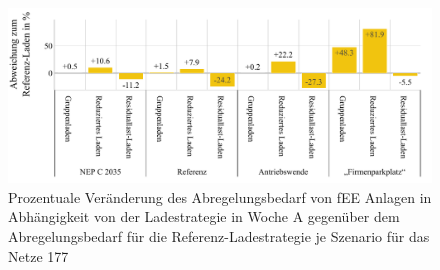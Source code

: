 \begin{figure}[H]
    \centering
    \includegraphics[width=\textwidth]{Bilder/177_cur_fee_grid_week_A}
    \caption{Prozentuale Veränderung des Abregelungsbedarf von fEE Anlagen in Abhängigkeit von der Ladestrategie in Woche A gegenüber dem Abregelungsbedarf für die Referenz-Ladestrategie je Szenario für das Netze \num{177}}\label{fig:177_cur_fee_grid_week_A}
\end{figure}